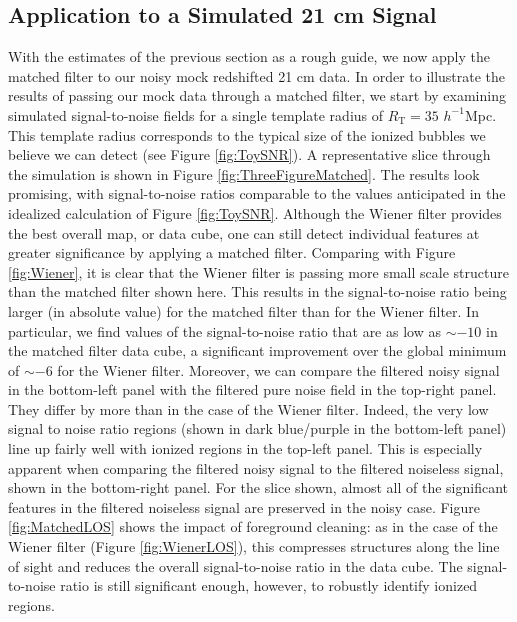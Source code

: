 \subsection{Application to a Simulated 21 cm Signal} \label{sec:Bubblemapplied}

With the estimates of the previous section as a rough guide, we now
apply the matched filter to our noisy mock redshifted 21 cm data.
In order to illustrate the results of passing our mock data through
a matched filter, we start by examining simulated signal-to-noise fields
for a single template radius of $R_{\text{T}} = 35$ $h^{-1}$Mpc. This template
radius corresponds to the typical size of the ionized bubbles we believe
we can detect (see Figure \ref{fig:ToySNR}). A representative slice
through the simulation is shown in Figure \ref{fig:ThreeFigureMatched}.
The results look promising, with signal-to-noise ratios comparable
to the values anticipated in the idealized calculation of Figure \ref{fig:ToySNR}. 
Although the Wiener filter provides
the best overall map, or data cube, one can still detect individual features at greater
significance by applying a matched filter.
Comparing
with Figure \ref{fig:Wiener}, it is clear that the Wiener filter is
passing more small scale structure than the matched filter shown here.
This results in the signal-to-noise ratio being larger (in absolute value) 
for the matched filter than for the Wiener filter.
In particular, we find values
of the signal-to-noise ratio that are as low as $\sim -10$ in the matched filter data cube, a significant improvement over the global minimum 
of $\sim -6$ for the Wiener filter.
Moreover, we can compare the filtered noisy signal in the bottom-left panel
with the filtered pure noise field in the top-right panel. They differ by
more than in the case of the Wiener filter. Indeed, the very low signal to noise
ratio regions (shown in dark blue/purple in the bottom-left panel) line up fairly well
with ionized regions in the top-left panel. This is especially apparent when comparing the filtered noisy signal to the filtered noiseless signal, shown in the bottom-right panel. For the slice shown, almost all of the significant features in the filtered noiseless signal are preserved in the noisy case. Figure \ref{fig:MatchedLOS}
shows the impact of foreground cleaning: as in the case of the Wiener filter (Figure \ref{fig:WienerLOS}),
this compresses structures along the line of sight and reduces the overall
signal-to-noise ratio in the data cube. The signal-to-noise ratio is still 
significant enough,
however, to robustly identify ionized regions.

